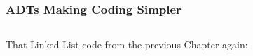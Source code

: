 
\begin{frame}[fragile]
\frametitle{ADTs Making Coding Simpler}
\begin{columns}[T]

\begin{column}{0.45\textwidth}
That Linked List code from the previous Chapter again:
\end{column}

\pause
\begin{column}{0.45\textwidth}

\end{column}

\end{columns}
\end{frame}


\endinput
